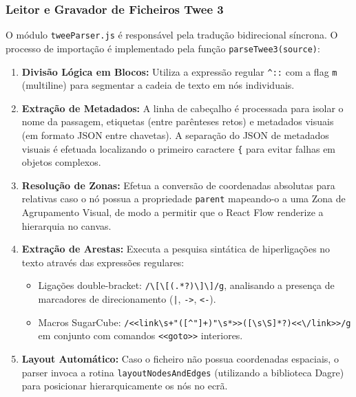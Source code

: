 \subsubsection{Leitor e Gravador de Ficheiros Twee 3}
O módulo \texttt{tweeParser.js} é responsável pela tradução bidirecional síncrona. O processo de importação é implementado pela função \texttt{parseTwee3(source)}:
\begin{enumerate}
    \item \textbf{Divisão Lógica em Blocos:} Utiliza a expressão regular \lstinline|^::| com a flag \lstinline|m| (multiline) para segmentar a cadeia de texto em nós individuais.
    \item \textbf{Extração de Metadados:} A linha de cabeçalho é processada para isolar o nome da passagem, etiquetas (entre parênteses retos) e metadados visuais (em formato JSON entre chavetas). A separação do JSON de metadados visuais é efetuada localizando o primeiro caractere \lstinline|{| para evitar falhas em objetos complexos.
    \item \textbf{Resolução de Zonas:} Efetua a conversão de coordenadas absolutas para relativas caso o nó possua a propriedade \texttt{parent} mapeando-o a uma Zona de Agrupamento Visual, de modo a permitir que o React Flow renderize a hierarquia no canvas.
    \item \textbf{Extração de Arestas:} Executa a pesquisa sintática de hiperligações no texto através das expressões regulares:
    \begin{itemize}
        \item Ligações double-bracket: \lstinline|/\[\[(.*?)\]\]/g|, analisando a presença de marcadores de direcionamento (\lstinline/|/, \lstinline/->/, \lstinline/<-/).
        \item Macros SugarCube: \lstinline|/<<link\s+"([^"]+)"\s*>>([\s\S]*?)<<\/link>>/g| em conjunto com comandos \lstinline|<<goto>>| interiores.
    \end{itemize}
    \item \textbf{Layout Automático:} Caso o ficheiro não possua coordenadas espaciais, o parser invoca a rotina \texttt{layoutNodesAndEdges} (utilizando a biblioteca Dagre) para posicionar hierarquicamente os nós no ecrã.
\end{enumerate}

